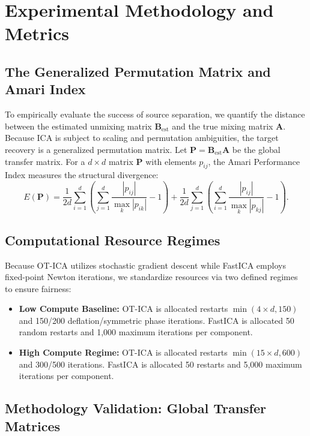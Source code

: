 \documentclass[accepted]{tpm2026} %
\begin{document}
\section{Experimental Methodology and Metrics}
\label{app:experimental_setup}

\subsection{The Generalized Permutation Matrix and Amari Index}
To empirically evaluate the success of source separation, we quantify the distance between the estimated unmixing matrix $\mathbf{B}_{\text{est}}$ and 
the true mixing matrix $\mathbf{A}$. Because ICA is subject to scaling and permutation ambiguities, the target recovery is a generalized permutation matrix. 
Let $\mathbf{P} = \mathbf{B}_{\text{est}} \mathbf{A}$ be the global transfer matrix. For a $d \times d$ matrix $\mathbf{P}$ with elements $p_{ij}$, 
the Amari Performance Index \citep{amari1996new} measures the structural divergence:
\begin{equation}
    E(\mathbf{P}) = \frac{1}{2d} \sum_{i=1}^d \left( \sum_{j=1}^d \frac{|p_{ij}|}{\max_k |p_{ik}|} - 1 \right) + \frac{1}{2d} \sum_{j=1}^d \left( \sum_{i=1}^d \frac{|p_{ij}|}{\max_k |p_{kj}|} - 1 \right).
\end{equation}

\subsection{Computational Resource Regimes}
Because OT-ICA utilizes stochastic gradient descent while FastICA employs fixed-point Newton iterations, we standardize resources via two defined regimes to ensure fairness:
\begin{itemize}
    \item \textbf{Low Compute Baseline:} OT-ICA is allocated restarts $\min(4 \times d, 150)$ and 150/200 deflation/symmetric phase iterations.
    FastICA is allocated 50 random restarts and 1,000 maximum iterations per component.
    \item \textbf{High Compute Regime:} OT-ICA is allocated restarts $\min(15 \times d, 600)$ and 300/500 iterations.
    FastICA is allocated 50 restarts and 5,000 maximum iterations per component.
\end{itemize}

\subsection{Methodology Validation: Global Transfer Matrices}
\label{app:validation_table}
\end{document}
